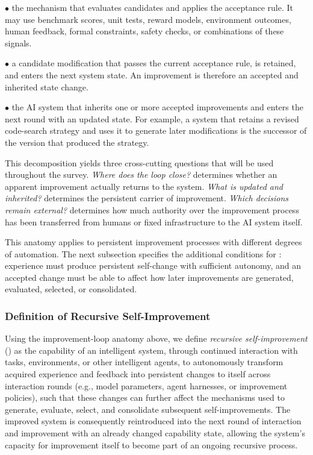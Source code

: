 \noindent$\bullet$  the mechanism that evaluates candidates and applies the acceptance rule. It may use benchmark scores, unit tests, reward models, environment outcomes, human feedback, formal constraints, safety checks, or combinations of these signals.

\noindent$\bullet$  a candidate modification that passes the current acceptance rule, is retained, and enters the next system state. An improvement is therefore an accepted and inherited state change.



\noindent$\bullet$  the AI system that inherits one or more accepted improvements and enters the next round with an updated state. For example, a system that retains a revised code-search strategy and uses it to generate later modifications is the successor of the version that produced the strategy.

This decomposition yields three cross-cutting questions that will be used throughout the survey. \emph{Where does the loop close?} determines whether an apparent improvement actually returns to the system. \emph{What is updated and inherited?} determines the persistent carrier of improvement. \emph{Which decisions remain external?} determines how much authority over the improvement process has been transferred from humans or fixed infrastructure to the AI system itself.

This anatomy applies to persistent improvement processes with different degrees of automation. The next subsection specifies the additional conditions for \RSI{}: experience must produce persistent self-change with sufficient autonomy, and an accepted change must be able to affect how later improvements are generated, evaluated, selected, or consolidated.

\subsubsection{Definition of Recursive Self-Improvement}
Using the improvement-loop anatomy above, we define \emph{recursive self-improvement} (\RSI) as the capability of an intelligent system, through continued interaction with tasks, environments, or other intelligent agents, to autonomously transform acquired experience and feedback into persistent changes to itself across interaction rounds (e.g., model parameters, agent harnesses, or improvement policies), such that these changes can further affect the mechanisms used to generate, evaluate, select, and consolidate subsequent self-improvements. The improved system is consequently reintroduced into the next round of interaction and improvement with an already changed capability state, allowing the system's capacity for improvement itself to become part of an ongoing recursive process.

